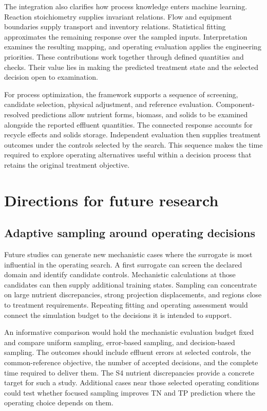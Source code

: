 The integration also clarifies how process knowledge enters machine learning. Reaction stoichiometry supplies invariant relations. Flow and equipment boundaries supply transport and inventory relations. Statistical fitting approximates the remaining response over the sampled inputs. Interpretation examines the resulting mapping, and operating evaluation applies the engineering priorities. These contributions work together through defined quantities and checks. Their value lies in making the predicted treatment state and the selected decision open to examination.

For process optimization, the framework supports a sequence of screening, candidate selection, physical adjustment, and reference evaluation. Component-resolved predictions allow nutrient forms, biomass, and solids to be examined alongside the reported effluent quantities. The connected response accounts for recycle effects and solids storage. Independent evaluation then supplies treatment outcomes under the controls selected by the search. This sequence makes the time required to explore operating alternatives useful within a decision process that retains the original treatment objective.

\section{Directions for future research}

\subsection{Adaptive sampling around operating decisions}

Future studies can generate new mechanistic cases where the surrogate is most influential in the operating search. A first surrogate can screen the declared domain and identify candidate controls. Mechanistic calculations at those candidates can then supply additional training states. Sampling can concentrate on large nutrient discrepancies, strong projection displacements, and regions close to treatment requirements. Repeating fitting and operating assessment would connect the simulation budget to the decisions it is intended to support.

An informative comparison would hold the mechanistic evaluation budget fixed and compare uniform sampling, error-based sampling, and decision-based sampling. The outcomes should include effluent errors at selected controls, the common-reference objective, the number of accepted decisions, and the complete time required to deliver them. The S4 nutrient discrepancies provide a concrete target for such a study. Additional cases near those selected operating conditions could test whether focused sampling improves TN and TP prediction where the operating choice depends on them.


